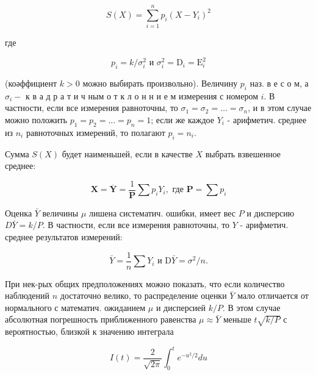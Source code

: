 \documentclass[10pt]{article}
\begin{document}
\[

S(X)=\sum_{i=1}^{n} p_{i}\left(X-Y_{i}\right)^{2}

\]



где



\[

p_{i}=k / \sigma_{i}^{2} \text { и } \sigma_{i}^{2}=\mathrm{D}_{i}=\mathrm{E}_{i}^{2}

\]



(коәффициент $k>0$ можно выбирать произвольно). Величину $p_{i}$ наз. в е с о м, а $\sigma_{i}-$ к в а д р а т и ч ным о т к л о н н и е м измерения с номером $i$. В частности, если все измерения равноточны, то $\sigma_{1}=\sigma_{2}=\ldots=\sigma_{n}$, и в этом случае можно положить $p_{1}=p_{2}=\ldots=p_{n}=1$; если же каждое $Y_{i}$ - арифметич. среднее из $n_{i}$ равноточных измерений, то полагают $p_{i}=n_{i}$.



Сумма $S(X)$ будет наименьшей, если в качестве $X$ выбрать взвешенное среднее:



\[

\boldsymbol{X}=\overline{\boldsymbol{Y}}=\frac{1}{\boldsymbol{P}} \sum p_{i} Y_{i}, \text { где } \boldsymbol{P}=\sum p_{i}

\]



Оценка $\bar{Y}$ величины $\mu$ лишена систематич. ошибки, имеет вес $P$ и дисперсию $D \bar{Y}=k / P$. В частности, если все измерения равноточны, то $Y$ - арифметич. среднее результатов измерений:



\[

\bar{Y}=\frac{1}{n} \sum Y_{i} \text { и } \mathrm{D} \bar{Y}=\sigma^{2} / n .

\]



При нек-рых общих предположениях можно показать, что если количество наблюдений $n$ достаточно велико, то распределение оценки $\bar{Y}$ мало отличается от нормального с математич. ожиданием $\mu$ и дисперсией $k / P$. В этом случае абсолютная погрешность приближенного равенства $\mu \approx \bar{Y}$ меньше $t \sqrt{k / P}$ с вероятностью, близкой к значению интеграла



\[

I(t)=\frac{2}{\sqrt{2 \pi}} \int_{0}^{t} e^{-u^{2} / 2} d u

\]
\end{document}
